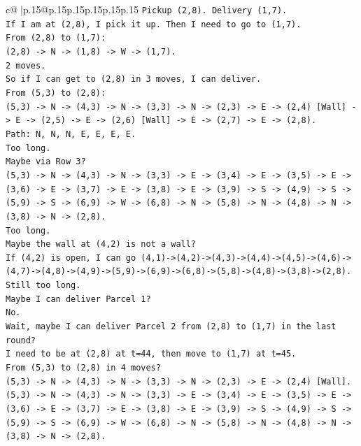 \documentclass{article}
\begin{document}
{\begin{supertabular}{c@{$\;$}|p{.15\linewidth}@{}p{.15\linewidth}p{.15\linewidth}p{.15\linewidth}p{.15\linewidth}p{.15\linewidth}}
{{{\texttt{Pickup (2,8). Delivery (1,7).} \\
\texttt{If I am at (2,8), I pick it up. Then I need to go to (1,7).} \\
\texttt{From (2,8) to (1,7):} \\
\texttt{(2,8) {-}> N {-}> (1,8) {-}> W {-}> (1,7).} \\
\texttt{2 moves.} \\
\texttt{So if I can get to (2,8) in 3 moves, I can deliver.} \\
\texttt{From (5,3) to (2,8):} \\
\texttt{(5,3) {-}> N {-}> (4,3) {-}> N {-}> (3,3) {-}> N {-}> (2,3) {-}> E {-}> (2,4) {[}Wall{]} {-}> E {-}> (2,5) {-}> E {-}> (2,6) {[}Wall{]} {-}> E {-}> (2,7) {-}> E {-}> (2,8).} \\
\texttt{Path: N, N, N, E, E, E, E.} \\
\texttt{Too long.} \\
\texttt{Maybe via Row 3?} \\
\texttt{(5,3) {-}> N {-}> (4,3) {-}> N {-}> (3,3) {-}> E {-}> (3,4) {-}> E {-}> (3,5) {-}> E {-}> (3,6) {-}> E {-}> (3,7) {-}> E {-}> (3,8) {-}> E {-}> (3,9) {-}> S {-}> (4,9) {-}> S {-}> (5,9) {-}> S {-}> (6,9) {-}> W {-}> (6,8) {-}> N {-}> (5,8) {-}> N {-}> (4,8) {-}> N {-}> (3,8) {-}> N {-}> (2,8).} \\
\texttt{Too long.} \\
\texttt{Maybe the wall at (4,2) is not a wall?} \\
\texttt{If (4,2) is open, I can go (4,1){-}>(4,2){-}>(4,3){-}>(4,4){-}>(4,5){-}>(4,6){-}>(4,7){-}>(4,8){-}>(4,9){-}>(5,9){-}>(6,9){-}>(6,8){-}>(5,8){-}>(4,8){-}>(3,8){-}>(2,8).} \\
\texttt{Still too long.} \\
\texttt{Maybe I can deliver Parcel 1?} \\
\texttt{No.} \\
\texttt{Wait, maybe I can deliver Parcel 2 from (2,8) to (1,7) in the last round?} \\
\texttt{I need to be at (2,8) at t=44, then move to (1,7) at t=45.} \\
\texttt{From (5,3) to (2,8) in 4 moves?} \\
\texttt{(5,3) {-}> N {-}> (4,3) {-}> N {-}> (3,3) {-}> N {-}> (2,3) {-}> E {-}> (2,4) {[}Wall{]}.} \\
\texttt{(5,3) {-}> N {-}> (4,3) {-}> N {-}> (3,3) {-}> E {-}> (3,4) {-}> E {-}> (3,5) {-}> E {-}> (3,6) {-}> E {-}> (3,7) {-}> E {-}> (3,8) {-}> E {-}> (3,9) {-}> S {-}> (4,9) {-}> S {-}> (5,9) {-}> S {-}> (6,9) {-}> W {-}> (6,8) {-}> N {-}> (5,8) {-}> N {-}> (4,8) {-}> N {-}> (3,8) {-}> N {-}> (2,8).} \\
}}}
\end{supertabular}}
\end{document}
